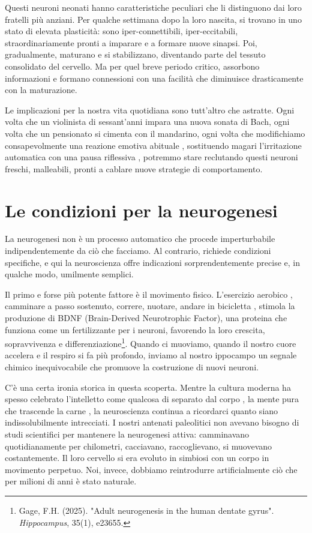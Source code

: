 Questi neuroni neonati hanno caratteristiche peculiari che li distinguono dai loro fratelli più anziani. Per qualche settimana dopo la loro nascita, si trovano in uno stato di elevata plasticità: sono iper-connettibili, iper-eccitabili, straordinariamente pronti a imparare e a formare nuove sinapsi. Poi, gradualmente, maturano e si stabilizzano, diventando parte del tessuto consolidato del cervello. Ma per quel breve periodo critico, assorbono informazioni e formano connessioni con una facilità che diminuisce drasticamente con la maturazione.

Le implicazioni per la nostra vita quotidiana sono tutt'altro che astratte. Ogni volta che un violinista di sessant'anni impara una nuova sonata di Bach, ogni volta che un pensionato si cimenta con il mandarino, ogni volta che modifichiamo consapevolmente una reazione emotiva abituale , sostituendo magari l'irritazione automatica con una pausa riflessiva , potremmo stare reclutando questi neuroni freschi, malleabili, pronti a cablare nuove strategie di comportamento.

\section{Le condizioni per la neurogenesi}

La neurogenesi non è un processo automatico che procede imperturbabile indipendentemente da ciò che facciamo. Al contrario, richiede condizioni specifiche, e qui la neuroscienza offre indicazioni sorprendentemente precise e, in qualche modo, umilmente semplici.

Il primo e forse più potente fattore è il movimento fisico. L'esercizio aerobico , camminare a passo sostenuto, correre, nuotare, andare in bicicletta , stimola la produzione di BDNF (Brain-Derived Neurotrophic Factor), una proteina che funziona come un fertilizzante per i neuroni, favorendo la loro crescita, sopravvivenza e differenziazione\footnote{Gage, F.H. (2025). "Adult neurogenesis in the human dentate gyrus". \textit{Hippocampus}, 35(1), e23655.}. Quando ci muoviamo, quando il nostro cuore accelera e il respiro si fa più profondo, inviamo al nostro ippocampo un segnale chimico inequivocabile che promuove la costruzione di nuovi neuroni.

C'è una certa ironia storica in questa scoperta. Mentre la cultura moderna ha spesso celebrato l'intelletto come qualcosa di separato dal corpo , la mente pura che trascende la carne , la neuroscienza continua a ricordarci quanto siano indissolubilmente intrecciati. I nostri antenati paleolitici non avevano bisogno di studi scientifici per mantenere la neurogenesi attiva: camminavano quotidianamente per chilometri, cacciavano, raccoglievano, si muovevano costantemente. Il loro cervello si era evoluto in simbiosi con un corpo in movimento perpetuo. Noi, invece, dobbiamo reintrodurre artificialmente ciò che per milioni di anni è stato naturale.

